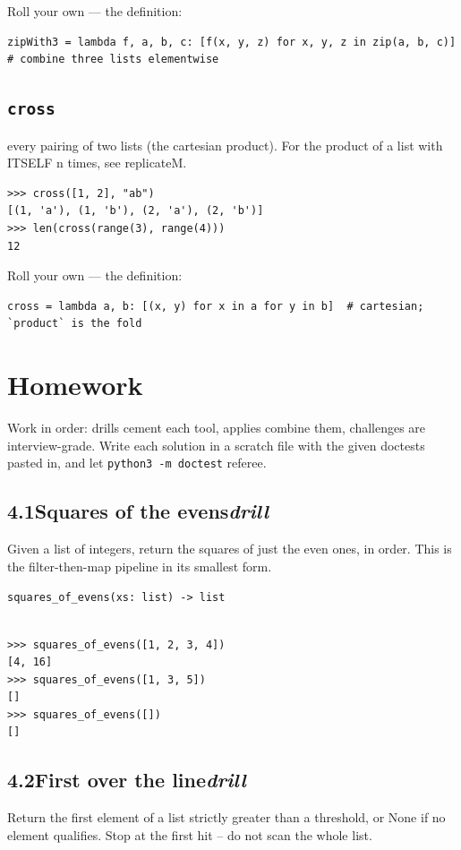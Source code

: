\documentclass[10pt,letterpaper]{book}
\begin{document}
Roll your own --- the definition:

\begin{lstlisting}[style=ex]
zipWith3 = lambda f, a, b, c: [f(x, y, z) for x, y, z in zip(a, b, c)]  # combine three lists elementwise
\end{lstlisting}
\subsection{\texttt{cross}}\label{def:cross}
every pairing of two lists (the cartesian product). For the product of a list with ITSELF n times, see replicateM.
\begin{lstlisting}[style=ex]
>>> cross([1, 2], "ab")
[(1, 'a'), (1, 'b'), (2, 'a'), (2, 'b')]
>>> len(cross(range(3), range(4)))
12
\end{lstlisting}

Roll your own --- the definition:

\begin{lstlisting}[style=ex]
cross = lambda a, b: [(x, y) for x in a for y in b]  # cartesian; `product` is the fold
\end{lstlisting}

\section{Homework}
Work in order: drills cement each tool, applies combine them,
challenges are interview-grade. Write each solution in a scratch file with
the given doctests pasted in, and let \texttt{python3 -m doctest} referee.
\subsection*{4.1\quad Squares of the evens\hfill\textnormal{\textit{drill}}}
Given a list of integers, return the squares of just the even ones, in order. This is the filter-then-map pipeline in its smallest form.

\noindent\texttt{squares\_of\_evens(xs: list) -> list}
\begin{lstlisting}[style=ex]

>>> squares_of_evens([1, 2, 3, 4])
[4, 16]
>>> squares_of_evens([1, 3, 5])
[]
>>> squares_of_evens([])
[]

\end{lstlisting}
\subsection*{4.2\quad First over the line\hfill\textnormal{\textit{drill}}}
Return the first element of a list strictly greater than a threshold, or None if no element qualifies. Stop at the first hit -- do not scan the whole list.
\end{document}
